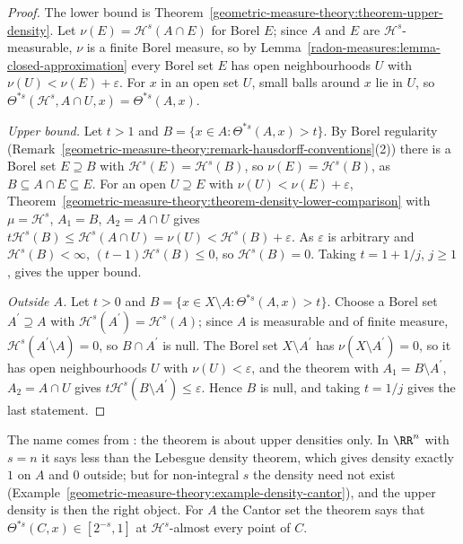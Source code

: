 \begin{proof}
The lower bound is Theorem~\ref{geometric-measure-theory:theorem-upper-density}. Let $\nu(E) = \mathcal{H}^s(A \cap E)$ for Borel $E$; since $A$ and $E$ are $\mathcal{H}^s$-measurable, $\nu$ is a finite Borel measure, so
by Lemma~\ref{radon-measures:lemma-closed-approximation} every Borel set $E$ has open neighbourhoods $U$ with $\nu(U) < \nu(E) + \varepsilon$. For $x$ in an open set $U$, small balls around $x$ lie in $U$, so
$\Theta^{*s}(\mathcal{H}^s, A \cap U, x) = \Theta^{*s}(A, x)$.

\emph{Upper bound.} Let $t > 1$ and $B = \{x \in A : \Theta^{*s}(A, x) > t\}$. By Borel regularity (Remark~\ref{geometric-measure-theory:remark-hausdorff-conventions}(2)) there is a Borel set $E \supseteq B$ with
$\mathcal{H}^s(E) = \mathcal{H}^s(B)$, so $\nu(E) = \mathcal{H}^s(B)$, as $B \subseteq A \cap E \subseteq E$. For an open $U \supseteq E$ with $\nu(U) < \nu(E) + \varepsilon$,
Theorem~\ref{geometric-measure-theory:theorem-density-lower-comparison} with $\mu = \mathcal{H}^s$, $A_1 = B$, $A_2 = A \cap U$ gives $t\mathcal{H}^s(B) \leq \mathcal{H}^s(A \cap U) = \nu(U) < \mathcal{H}^s(B) + \varepsilon$. As
$\varepsilon$ is arbitrary and $\mathcal{H}^s(B) < \infty$, $(t - 1)\mathcal{H}^s(B) \leq 0$, so $\mathcal{H}^s(B) = 0$. Taking $t = 1 + 1/j$, $j \geq 1$, gives the upper bound.

\emph{Outside $A$.} Let $t > 0$ and $B = \{x \in X \setminus A : \Theta^{*s}(A, x) > t\}$. Choose a Borel set $A^{\prime} \supseteq A$ with $\mathcal{H}^s(A^{\prime}) = \mathcal{H}^s(A)$; since $A$ is measurable and of finite
measure, $\mathcal{H}^s(A^{\prime} \setminus A) = 0$, so $B \cap A^{\prime}$ is null. The Borel set $X \setminus A^{\prime}$ has $\nu(X \setminus A^{\prime}) = 0$, so it has open neighbourhoods $U$ with $\nu(U) < \varepsilon$, and
the theorem with $A_1 = B \setminus A^{\prime}$, $A_2 = A \cap U$ gives $t\mathcal{H}^s(B \setminus A^{\prime}) \leq \varepsilon$. Hence $B$ is null, and taking $t = 1/j$ gives the last statement.
\end{proof}

The name comes from \cite{simon-gmt}: the theorem is about upper densities only. In $\RR^n$ with $s = n$ it says less than the Lebesgue density theorem, which gives density exactly $1$ on $A$ and $0$
outside; but for non-integral $s$ the density need not exist (Example~\ref{geometric-measure-theory:example-density-cantor}), and the upper density is then the right object. For $A$ the Cantor set the theorem
says that $\Theta^{*s}(C, x) \in [2^{-s}, 1]$ at $\mathcal{H}^s$-almost every point of $C$.

